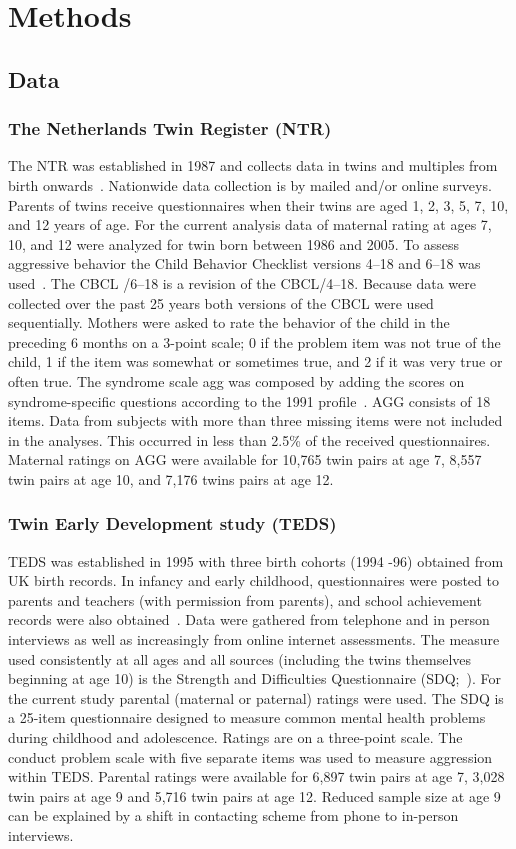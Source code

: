 ﻿\section{Methods}
\subsection{Data}
\subsubsection{The Netherlands Twin Register (NTR)}
The NTR was established in 1987 and collects data in twins and multiples from birth onwards~\cite{Willemsen2013a}.
Nationwide data collection is by mailed and/or online surveys.
Parents of twins receive questionnaires when their twins are aged 1, 2, 3, 5, 7, 10, and 12 years of age.
For the current analysis data of maternal rating at ages 7, 10, and 12 were analyzed for twin born between 1986 and 2005.
To assess aggressive behavior the Child Behavior Checklist versions 4--18 and 6--18 was used~\cite{Achenbach2003}.
The CBCL /6--18 is a revision of the CBCL/4--18.
Because data were collected over the past 25 years both versions of the CBCL were used sequentially.
Mothers were asked to rate the behavior of the child in the preceding 6 months on a 3-point scale; 0 if the problem item was not true of the child, 1 if the item was somewhat or sometimes true, and 2 if it was very true or often true.
The syndrome scale \acrfull{agg} was composed by adding the scores on syndrome-specific questions according to the 1991 profile~\cite{Achenbach2003}.
AGG consists of 18 items.
Data from subjects with more than three missing items were not included in the analyses.
This occurred in less than 2.5\% of the received questionnaires.
Maternal ratings on AGG were available for 10,765 twin pairs at age 7, 8,557 twin pairs at age 10, and 7,176 twins pairs at age 12.

\subsubsection{Twin Early Development study (TEDS)}
TEDS was established in 1995 with three birth cohorts (1994 -96) obtained from UK birth records.
In infancy and early childhood, questionnaires were posted to parents and teachers (with permission from parents), and school achievement records were also obtained~\cite{Haworth2012}.
Data were gathered from telephone and in person interviews as well as increasingly from online internet assessments.
The measure used consistently at all ages and all sources (including the twins themselves beginning at age 10) is the Strength and Difficulties Questionnaire (SDQ;~\cite{Goodman1997, Goodman2001}).
For the current study parental (maternal or paternal) ratings were used.
The SDQ is a 25-item questionnaire designed to measure common mental health problems during childhood and adolescence.
Ratings are on a three-point scale.
The conduct problem scale with five separate items was used to measure aggression within TEDS\@.
Parental ratings were available for 6,897 twin pairs at age 7, 3,028 twin pairs at age 9 and 5,716 twin pairs at age 12.
Reduced sample size at age 9 can be explained by a shift in contacting scheme from phone to in-person interviews.

